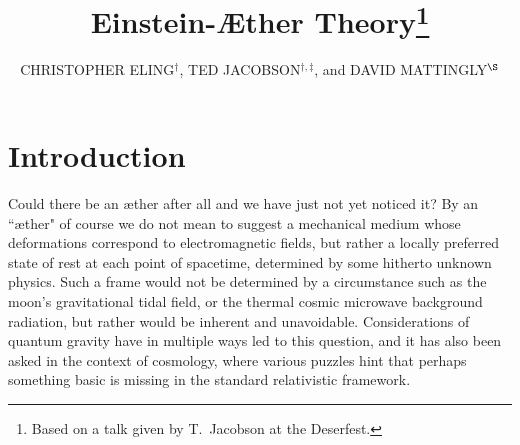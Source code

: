 \documentclass[aps]{ws-procs9x6}
\begin{document}
\title{Einstein-\AE ther Theory\footnote{\uppercase{B}ased
on a talk given by \uppercase{T}.~\uppercase{J}acobson
at the \uppercase{D}eserfest.}}

\author{CHRISTOPHER ELING$^\dagger$, TED JACOBSON$^{\dagger,\ddagger}$, and DAVID MATTINGLY$^\S$}

\vspace{5mm}
\address{$^\dagger$~Dept. of Physics,
University of Maryland,
College Park, MD 20742-4111, USA\\
$^\ddagger$~Institut d'Astrophysique de Paris,
98bis Bvd. Arago, 75014 Paris, France\\
$^\S$~Dept. of Physics, University of California, Davis,
California, 95616, USA}





\maketitle


\section{Introduction}

Could there be an {\ae}ther after all and we have just not yet
noticed it? By an ``{\ae}ther" of course we do not mean to
suggest a mechanical medium whose deformations correspond to
electromagnetic fields, but rather a locally preferred state of
rest at each point of spacetime, determined by some hitherto
unknown physics. Such a frame would not be determined by a
circumstance such as the moon's gravitational tidal field, or the
thermal cosmic microwave background radiation, but rather would
be inherent and unavoidable. Considerations of quantum gravity
have in multiple ways led to this question, and it has also been
asked in the context of cosmology, where various puzzles hint
that perhaps something basic is missing in the standard
relativistic framework.
\end{document}
